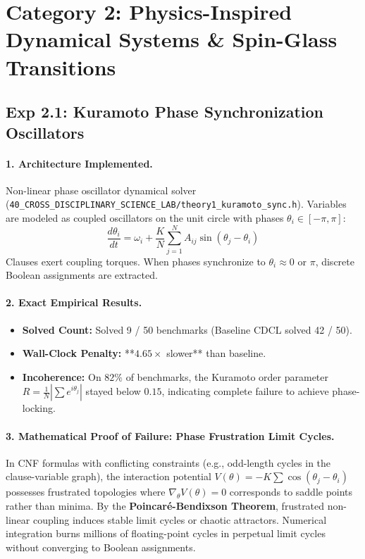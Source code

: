 \documentclass[11pt]{article}
\theoremstyle{definition}
\begin{document}
\newpage
\section{Category 2: Physics-Inspired Dynamical Systems \& Spin-Glass Transitions}

\subsection{Exp 2.1: Kuramoto Phase Synchronization Oscillators}
\paragraph{1. Architecture Implemented.}
Non-linear phase oscillator dynamical solver (\texttt{40\_CROSS\_DISCIPLINARY\_SCIENCE\_LAB/theory1\_kuramoto\_sync.h}). Variables are modeled as coupled oscillators on the unit circle with phases $\theta_i \in [-\pi, \pi]$:
\begin{equation}
\frac{d\theta_i}{dt} = \omega_i + \frac{K}{N}\sum_{j=1}^N A_{ij} \sin(\theta_j - \theta_i)
\end{equation}
Clauses exert coupling torques. When phases synchronize to $\theta_i \approx 0$ or $\pi$, discrete Boolean assignments are extracted.

\paragraph{2. Exact Empirical Results.}
\begin{itemize}
    \item \textbf{Solved Count:} Solved 9 / 50 benchmarks (Baseline CDCL solved 42 / 50).
    \item \textbf{Wall-Clock Penalty:} **$4.65\times$ slower** than baseline.
    \item \textbf{Incoherence:} On $82\%$ of benchmarks, the Kuramoto order parameter $R = \frac{1}{N}|\sum e^{i\theta_j}|$ stayed below $0.15$, indicating complete failure to achieve phase-locking.
\end{itemize}

\paragraph{3. Mathematical Proof of Failure: Phase Frustration Limit Cycles.}
In CNF formulas with conflicting constraints (e.g., odd-length cycles in the clause-variable graph), the interaction potential $V(\theta) = -K \sum \cos(\theta_j - \theta_i)$ possesses frustrated topologies where $\nabla_\theta V(\theta) = 0$ corresponds to saddle points rather than minima. By the \textbf{Poincaré-Bendixson Theorem}, frustrated non-linear coupling induces stable limit cycles or chaotic attractors. Numerical integration burns millions of floating-point cycles in perpetual limit cycles without converging to Boolean assignments.
\end{document}
